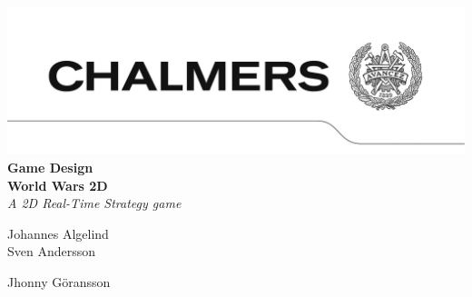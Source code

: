 \begin{titlepage}
\hspace*{-126pt}
\setlength{\voffset}{-129pt}
\enlargethispage{200pt}
\includegraphics[width=\paperwidth,keepaspectratio=true]{img/avancez.png}
\vspace*{130pt}\\
{\Huge\textbf{Game Design\\World Wars 2D}}
\vspace*{50pt}\\
\textit{A 2D Real-Time Strategy game}
\vspace*{30pt}\\
\begin{minipage}{0.4\textwidth}
\begin{flushleft}
Johannes Algelind\\
Sven Andersson\\
\end{flushleft}
\end{minipage}
\begin{minipage}{0.4\textwidth}
\begin{flushleft}
Jhonny Göransson\\
\end{flushleft}
\end{minipage}\\
\vspace*{110pt}\\
\end{titlepage}


